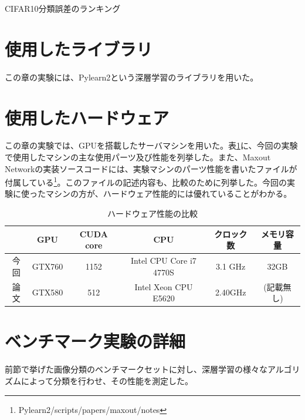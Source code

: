 \begin{table}[tbp]
 \begin{center}
  \caption{CIFAR10分類誤差のランキング}
 
 \end{center}

 \label{c5_cifar_rank}
\end{table}

\section{使用したライブラリ}
この章の実験には、Pylearn2という深層学習のライブラリを用いた。
\section{使用したハードウェア}
この章の実験では、GPUを搭載したサーバマシンを用いた。表\ref{c5_hardware_spec}に、今回の実験で使用したマシンの主な使用パーツ及び性能を列挙した。また、Maxout Networkの実装ソースコードには、実験マシンのパーツ性能を書いたファイルが付属している\footnote{Pylearn2/scripts/papers/maxout/notes}。このファイルの記述内容も、比較のために列挙した。今回の実験に使ったマシンの方が、ハードウェア性能的には優れていることがわかる。
\begin{table}[tbp]
 \begin{center}
  \caption{ハードウェア性能の比較}
  \begin{tabular}{|c|c|c|c|c|c|}\hline
   & GPU & CUDA core & CPU & クロック数 & メモリ容量\\ \hline
今回 & GTX760 & 1152 & Intel CPU Core i7 4770S & 3.1 GHz & 32GB\\ \hline
論文 & GTX580 & 512 & Intel Xeon CPU E5620 &  2.40GHz & (記載無し)\\ \hline
  \end{tabular}
 \end{center}

 \label{c5_hardware_spec}
\end{table}

\section{ベンチマーク実験の詳細}
前節で挙げた画像分類のベンチマークセットに対し、深層学習の様々なアルゴリズムによって分類を行わせ、その性能を測定した。

